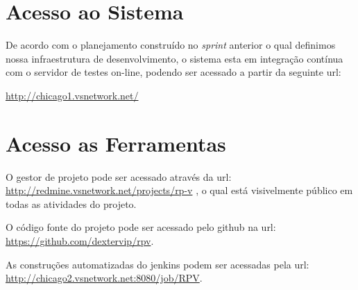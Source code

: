 \documentclass{abnt}
\begin{document}
	\clearpage

	\section{Acesso ao Sistema}
			De acordo com o planejamento construído no \emph{sprint} anterior o qual definimos nossa infraestrutura de desenvolvimento, 
			o sistema esta em integração contínua com o servidor de testes on-line, podendo ser acessado a partir da seguinte url:
		
			\url{http://chicago1.vsnetwork.net/}
			

	\section{Acesso as Ferramentas}
		
		O gestor de projeto pode ser acessado através da url: \url{http://redmine.vsnetwork.net/projects/rp-v} , o qual está visivelmente público em todas as atividades do projeto. 
		
		O código fonte do projeto pode ser acessado pelo github\cite{GITHUB} na url: \url{https://github.com/dextervip/rpv}. 
		
		As construções automatizadas do jenkins podem ser acessadas pela url: \url{http://chicago2.vsnetwork.net:8080/job/RPV}.

	\clearpage

	\nocite{*}
	
			
\end{document}
